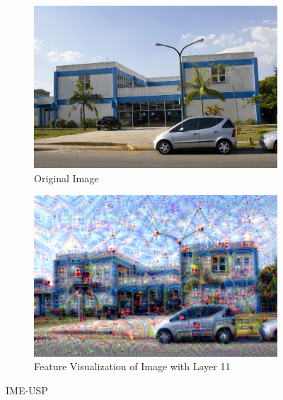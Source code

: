 \begin{figure}
    \captionsetup{justification=centering}

    \begin{subfigure}[t]{0.45\textwidth}
        \captionsetup{justification=centering}
        \centering
        \includegraphics[width=.7\linewidth]{figuras/feat_vis/experiments/non_random/ime-usp.jpg}
        \caption{Original Image}
    \end{subfigure}
    \hfill
    \begin{subfigure}[t]{0.45\textwidth}
        \captionsetup{justification=centering}
        \centering
        \includegraphics[width=.7\linewidth]{figuras/feat_vis/experiments/non_random/ime-usp_li24_lr4e-2_pl4_no-blur.png}
        \caption{Feature Visualization of Image with Layer 11}
    \end{subfigure}

    \caption{IME-USP}
    \label{fig:ime_dream}
\end{figure}

